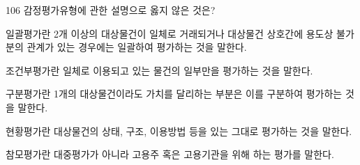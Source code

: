 \begin{question}{106}
감정평가유형에 관한 설명으로 옳지 않은 것은?
\begin{choices}
  \item 일괄평가란 2개 이상의 대상물건이 일체로 거래되거나 대상물건 상호간에 용도상 불가분의 관계가 있는 경우에는 일괄하여 평가하는 것을 말한다.
  \item 조건부평가란 일체로 이용되고 있는 물건의 일부만을 평가하는 것을 말한다.
  \item 구분평가란 1개의 대상물건이라도 가치를 달리하는 부분은 이를 구분하여 평가하는 것을 말한다.
  \item 현황평가란 대상물건의 상태, 구조, 이용방법 등을 있는 그대로 평가하는 것을 말한다.
  \item 참모평가란 대중평가가 아니라 고용주 혹은 고용기관을 위해 하는 평가를 말한다.
\end{choices}
\end{question}
